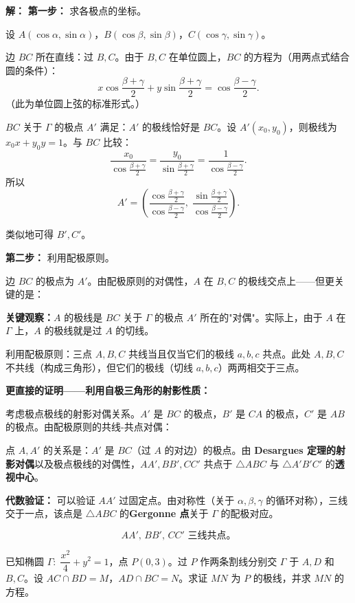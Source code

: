 \documentclass[12pt,a4paper]{ctexart}
\theoremstyle{definition}
\begin{document}
\begin{solutionbox}
\textbf{解：}
\textbf{第一步：} 求各极点的坐标。

设 $A(\cos\alpha,\sin\alpha)$，$B(\cos\beta,\sin\beta)$，$C(\cos\gamma,\sin\gamma)$。

边 $BC$ 所在直线：过 $B,C$。由于 $B,C$ 在单位圆上，$BC$ 的方程为（用两点式结合圆的条件）：
\[
  x\cos\frac{\beta+\gamma}{2}+y\sin\frac{\beta+\gamma}{2}=\cos\frac{\beta-\gamma}{2}.
\]
（此为单位圆上弦的标准形式。）

$BC$ 关于 $\Gamma$ 的极点 $A'$ 满足：$A'$ 的极线恰好是 $BC$。设 $A'(x_0,y_0)$，则极线为 $x_0 x+y_0 y=1$。与 $BC$ 比较：
\[
  \frac{x_0}{\cos\frac{\beta+\gamma}{2}}=\frac{y_0}{\sin\frac{\beta+\gamma}{2}}=\frac{1}{\cos\frac{\beta-\gamma}{2}}.
\]
所以
\[
  A'\!=\!\left(\frac{\cos\frac{\beta+\gamma}{2}}{\cos\frac{\beta-\gamma}{2}},\;\frac{\sin\frac{\beta+\gamma}{2}}{\cos\frac{\beta-\gamma}{2}}\right).
\]

类似地可得 $B',C'$。

\textbf{第二步：} 利用配极原则。

边 $BC$ 的极点为 $A'$。由配极原则的对偶性，$A$ 在 $B,C$ 的极线交点上——但更关键的是：

\textbf{关键观察：}$A$ 的极线是 $BC$ 关于 $\Gamma$ 的极点 $A'$ 所在的"对偶"。实际上，由于 $A$ 在 $\Gamma$ 上，$A$ 的极线就是过 $A$ 的切线。

利用配极原则：三点 $A,B,C$ 共线当且仅当它们的极线 $a,b,c$ 共点。此处 $A,B,C$ 不共线（构成三角形），但它们的极线（切线 $a,b,c$）两两相交于三点。

\textbf{更直接的证明——利用自极三角形的射影性质：}

考虑极点极线的射影对偶关系。$A'$ 是 $BC$ 的极点，$B'$ 是 $CA$ 的极点，$C'$ 是 $AB$ 的极点。由配极原则的共线-共点对偶：

点 $A,A'$ 的关系是：$A'$ 是 $BC$（过 $A$ 的对边）的极点。由 \textbf{Desargues 定理的射影对偶}以及极点极线的对偶性，$AA',BB',CC'$ 共点于 $\triangle ABC$ 与 $\triangle A'B'C'$ 的\textbf{透视中心}。

\textbf{代数验证：}
可以验证 $AA'$ 过固定点。由对称性（关于 $\alpha,\beta,\gamma$ 的循环对称），三线交于一点，该点是 $\triangle ABC$ 的\textbf{Gergonne 点}关于 $\Gamma$ 的配极对应。

\[
  \boxed{AA',\,BB',\,CC'\text{ 三线共点。}}
\]
\end{solutionbox}

\vspace{6pt}

\begin{examplebox}
已知椭圆 $\Gamma:\;\dfrac{x^2}{4}+y^2=1$，点 $P(0,3)$。过 $P$ 作两条割线分别交 $\Gamma$ 于 $A,D$ 和 $B,C$。设 $AC\cap BD=M$，$AD\cap BC=N$。求证 $MN$ 为 $P$ 的极线，并求 $MN$ 的方程。
\end{examplebox}
\end{document}

